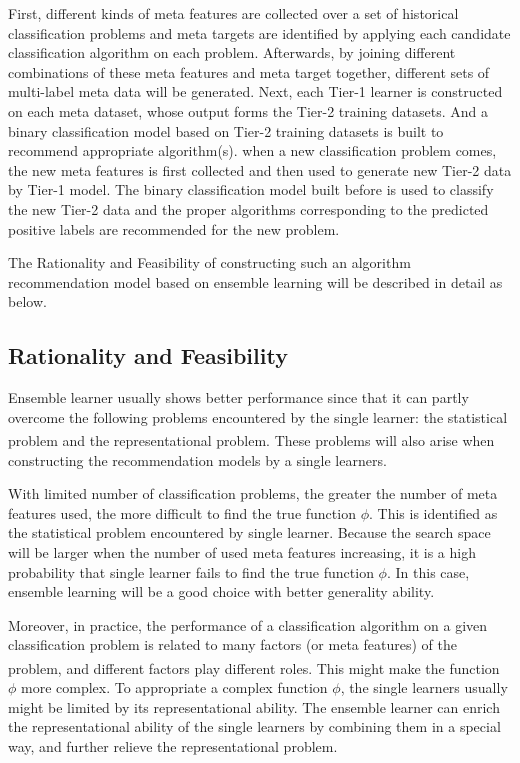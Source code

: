 \documentclass[review,3p,twocolumn,times]{elsarticle}
\newcommand{\upcite}[1]{\textsuperscript{\cite{#1}}}
\begin{document}
First, different kinds of meta features are collected over a set of historical classification problems and meta targets are identified by applying each candidate classification algorithm on each problem. Afterwards, by joining different combinations of these meta features and meta target together, different sets of multi-label meta data will be generated. Next, each Tier-1 learner is constructed on each meta dataset, whose output forms the Tier-2 training datasets. And a binary classification model based on Tier-2 training datasets is built to recommend appropriate algorithm(s). when a new classification problem comes, the new meta features is first collected and then used to generate new Tier-2 data by Tier-1 model. The binary classification model built before is used to classify the new Tier-2 data and the proper algorithms corresponding to the predicted positive labels are recommended for the new problem. 

The Rationality and Feasibility of constructing such an algorithm recommendation model based on ensemble learning will be described in detail as below.

\subsection{Rationality and Feasibility}

Ensemble learner usually shows better performance since that it can partly overcome the following problems encountered by the single learner: the statistical problem and the representational problem\upcite{dietterich2002ensemble}. These problems will also arise when constructing the recommendation models by a single learners.

With limited number of classification problems, the greater the number of meta features used, the more difficult to find the true function $\phi$. This is identified as the statistical problem encountered by single learner. Because the search space will be larger when the number of used meta features increasing, it is a high probability that single learner fails to find the true function $\phi$. In this case, ensemble learning will be a good choice with better generality ability.

Moreover, in practice, the performance of a classification algorithm on a given classification problem is related to many factors (or meta features) of the problem, and different factors play different roles\upcite{Wang2014A}. This might make the function $\phi$ more complex. To appropriate a complex function $\phi$, the single learners usually might be limited by its representational ability. The ensemble learner can enrich the representational ability of the single learners by combining them in a special way, and further relieve the representational problem. 
\end{document}
